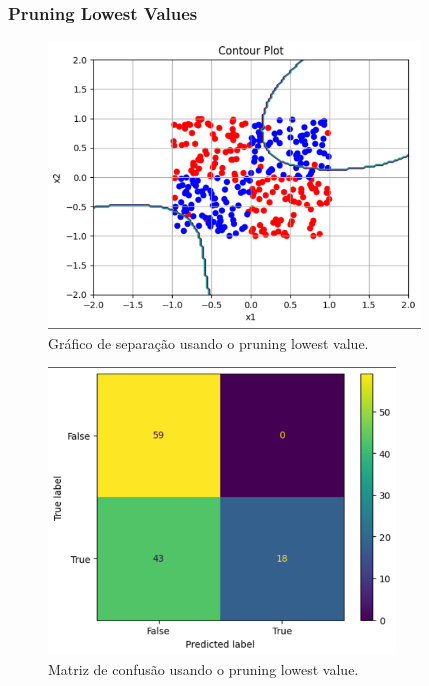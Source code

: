 \documentclass{article}
\begin{document}
\newpage

\subsubsection*{Pruning Lowest Values}

\vspace{25pt}

\begin{figure}[h]

    \centering
    \includegraphics[height=3in]{plot_sep_prun_low_val.png}
    \caption{Gráfico de separação usando o pruning lowest value.}
    \label{fig:example}
    
\end{figure}

\vspace{25pt}

\begin{figure}[h]

    \centering
    \includegraphics[height=3in]{conf_mat_prun_low_val.png}
    \caption{Matriz de confusão usando o pruning lowest value.}
    \label{fig:example}
    
\end{figure}
\end{document}
